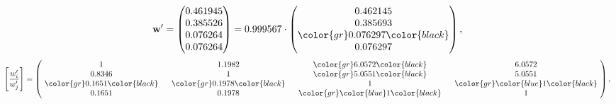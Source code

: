\begin{example}
\begin{equation*}
\mathbf{w}^{\prime} =
\begin{pmatrix}
0.461945\\
0.385526\\
0.076264\\
0.076264
\end{pmatrix} =
0.999567\cdot
\begin{pmatrix}
0.462145\\
0.385693\\
\color{gr} 0.076297\color{black} \\
0.076297
\end{pmatrix},
\end{equation*}
\begin{equation*}
\left[ \frac{{w}^{\prime}_i}{{w}^{\prime}_j} \right] =
\begin{pmatrix}
$\,\,$ 1 $\,\,$ & $\,\,$1.1982$\,\,$ & $\,\,$\color{gr} 6.0572\color{black} $\,\,$ & $\,\,$6.0572$\,\,$ \\
$\,\,$0.8346$\,\,$ & $\,\,$ 1 $\,\,$ & $\,\,$\color{gr} 5.0551\color{black} $\,\,$ & $\,\,$5.0551  $\,\,$ \\
$\,\,$\color{gr} 0.1651\color{black} $\,\,$ & $\,\,$\color{gr} 0.1978\color{black} $\,\,$ & $\,\,$ 1 $\,\,$ & $\,\,$\color{gr} \color{blue} 1\color{black}  $\,\,$ \\
$\,\,$0.1651$\,\,$ & $\,\,$0.1978$\,\,$ & $\,\,$\color{gr} \color{blue} 1\color{black} $\,\,$ & $\,\,$ 1  $\,\,$ \\
\end{pmatrix},
\end{equation*}
\end{example}
\newpage
